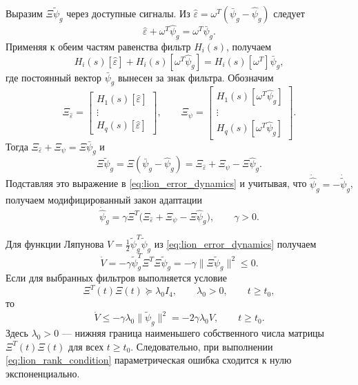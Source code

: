 Выразим $\Xi\tilde{\psi}_g$ через доступные сигналы. Из
$\hat{\varepsilon}=\omega^T(\bar{\psi}_g-\hat{\psi}_g)$ следует
$$
    \hat{\varepsilon}+\omega^T\hat{\psi}_g
    =\omega^T\bar{\psi}_g.
$$
Применяя к обеим частям равенства фильтр $H_i(s)$, получаем
$$
    H_i(s)[\hat{\varepsilon}]
    +H_i(s)[\omega^T\hat{\psi}_g]
    =H_i(s)[\omega^T]\bar{\psi}_g,
$$
где постоянный вектор $\bar{\psi}_g$ вынесен за знак фильтра.
Обозначим
$$
    \Xi_{\hat{\varepsilon}}=
    \begin{bmatrix}
        H_1(s)[\hat{\varepsilon}]\\
        \vdots\\
        H_q(s)[\hat{\varepsilon}]
    \end{bmatrix},
    \qquad
    \Xi_{\psi}=
    \begin{bmatrix}
        H_1(s)[\omega^T\hat{\psi}_g]\\
        \vdots\\
        H_q(s)[\omega^T\hat{\psi}_g]
    \end{bmatrix}.
$$
Тогда $\Xi_{\hat{\varepsilon}}+\Xi_{\psi}=\Xi\bar{\psi}_g$ и
$$
    \Xi\tilde{\psi}_g
    =\Xi(\bar{\psi}_g-\hat{\psi}_g)
    =\Xi_{\hat{\varepsilon}}+\Xi_{\psi}-\Xi\hat{\psi}_g.
$$
Подставляя это выражение в \eqref{eq:lion_error_dynamics} и
учитывая, что $\dot{\hat{\psi}}_g=-\dot{\tilde{\psi}}_g$,
получаем модифицированный закон адаптации
\begin{equation}
    \dot{\hat{\psi}}_g
    =\gamma\Xi^T
    \bigl(\Xi_{\hat{\varepsilon}}+\Xi_{\psi}-\Xi\hat{\psi}_g\bigr),
    \qquad \gamma>0.
    \label{eq:lion_adaptation}
\end{equation}

Для функции Ляпунова
$V=\frac{1}{2}\tilde{\psi}_g^T\tilde{\psi}_g$
из \eqref{eq:lion_error_dynamics} получаем
$$
    \dot V
    =-\gamma\tilde{\psi}_g^T\Xi^T\Xi\tilde{\psi}_g
    =-\gamma\|\Xi\tilde{\psi}_g\|^2
    \leq 0.
$$
Если для выбранных фильтров выполняется условие
\begin{equation}
    \Xi^T(t)\Xi(t)\succeq\lambda_0 I_4,
    \qquad \lambda_0>0,
    \qquad t\geq t_0,
    \label{eq:lion_rank_condition}
\end{equation}
то
$$
    \dot V\leq-\gamma\lambda_0\|\tilde{\psi}_g\|^2
    =-2\gamma\lambda_0 V,
    \qquad t\geq t_0.
$$
Здесь $\lambda_0>0$ --- нижняя граница наименьшего собственного числа матрицы $\Xi^T(t)\Xi(t)$ для всех $t\geq t_0$.
Следовательно, при выполнении \eqref{eq:lion_rank_condition}
параметрическая ошибка сходится к нулю экспоненциально.

